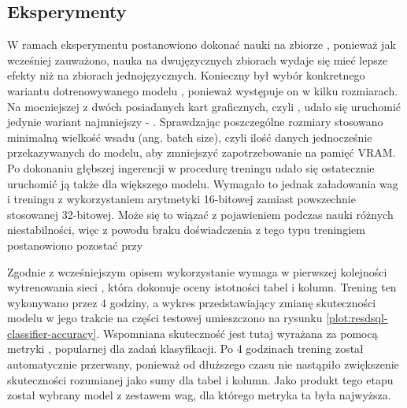 \subsection{Eksperymenty}
W ramach eksperymentu postanowiono dokonać nauki  na zbiorze , ponieważ jak wcześniej zauważono, nauka na dwujęzycznych zbiorach wydaje się mieć lepsze efekty niż na zbiorach jednojęzycznych. Konieczny był wybór konkretnego wariantu dotrenowywanego modelu , ponieważ występuje on w kilku rozmiarach. Na mocniejszej z dwóch posiadanych kart graficznych, czyli , udało się uruchomić jedynie wariant najmniejszy - . Sprawdzając poszczególne rozmiary stosowano minimalną wielkość wsadu (ang. batch size), czyli ilość danych jednocześnie przekazywanych do modelu, aby zmniejszyć zapotrzebowanie na pamięć VRAM. Po dokonaniu głębszej ingerencji w procedurę treningu udało się ostatecznie uruchomić ją także dla większego modelu. Wymagało to jednak załadowania wag i treningu z wykorzystaniem arytmetyki 16-bitowej zamiast powszechnie stosowanej 32-bitowej. Może się to wiązać z pojawieniem podczas nauki różnych niestabilności, więc z powodu braku doświadczenia z tego typu treningiem postanowiono pozostać przy 

Zgodnie z wcześniejszym opisem wykorzystanie  wymaga w pierwszej kolejności wytrenowania sieci , która dokonuje oceny istotności tabel i kolumn. Trening ten wykonywano przez 4 godziny, a wykres przedstawiający zmianę skuteczności modelu w jego trakcie na części testowej umieszczono na rysunku \ref{plot:resdsql-classifier-accuracy}. Wspomniana skuteczność jest tutaj wyrażana za pomocą metryki  , popularnej dla zadań klasyfikacji. Po 4 godzinach trening został automatycznie przerwany, ponieważ od dłuższego czasu nie nastąpiło zwiększenie skuteczności rozumianej jako sumy  dla tabel i kolumn. Jako produkt tego etapu został wybrany model z zestawem wag, dla którego metryka ta była najwyższa.

